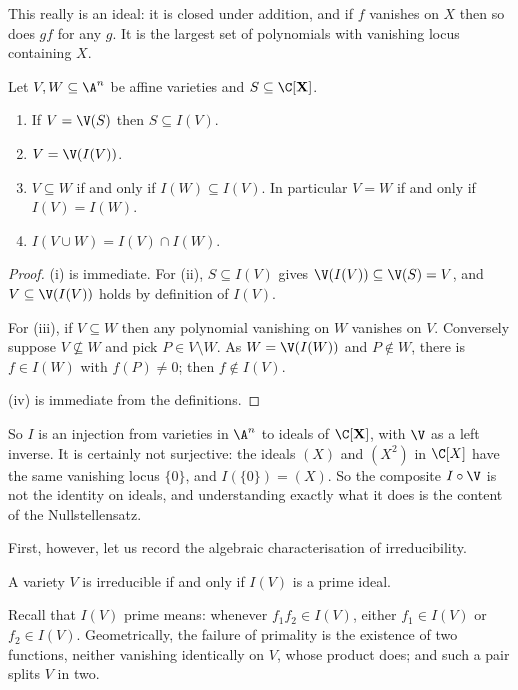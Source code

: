 This really is an ideal: it is closed under addition, and if $f$ vanishes on $X$ then so does $gf$ for any $g$. It is the largest set of polynomials with vanishing locus containing $X$.

\begin{proposition}\label{prop:IVbasic}
	Let $V, W \subseteq \A^n$ be affine varieties and $S \subseteq \C[\mathbf{X}]$.
	\begin{enumerate}[label=(\roman*)]
		\item If $V = \V(S)$ then $S \subseteq I(V)$.
		\item $V = \V(I(V))$.
		\item $V \subseteq W$ if and only if $I(W) \subseteq I(V)$. In particular $V = W$ if and only if $I(V) = I(W)$.
		\item $I(V \cup W) = I(V) \cap I(W)$.
	\end{enumerate}
\end{proposition}

\begin{proof}
	(i) is immediate. For (ii), $S \subseteq I(V)$ gives $\V(I(V)) \subseteq \V(S) = V$, and $V \subseteq \V(I(V))$ holds by definition of $I(V)$.

	For (iii), if $V \subseteq W$ then any polynomial vanishing on $W$ vanishes on $V$. Conversely suppose $V \not\subseteq W$ and pick $P \in V \setminus W$. As $W = \V(I(W))$ and $P \notin W$, there is $f \in I(W)$ with $f(P) \neq 0$; then $f \notin I(V)$.

	(iv) is immediate from the definitions.
\end{proof}

So $I$ is an injection from varieties in $\A^n$ to ideals of $\C[\mathbf{X}]$, with $\V$ as a left inverse. It is certainly not surjective: the ideals $(X)$ and $(X^2)$ in $\C[X]$ have the same vanishing locus $\{0\}$, and $I(\{0\}) = (X)$. So the composite $I \circ \V$ is not the identity on ideals, and understanding exactly what it does is the content of the Nullstellensatz.

First, however, let us record the algebraic characterisation of irreducibility.

\begin{proposition}\label{prop:irrprime}
	A variety $V$ is irreducible if and only if $I(V)$ is a prime ideal.
\end{proposition}

Recall that $I(V)$ prime means: whenever $f_1 f_2 \in I(V)$, either $f_1 \in I(V)$ or $f_2 \in I(V)$. Geometrically, the failure of primality is the existence of two functions, neither vanishing identically on $V$, whose product does; and such a pair splits $V$ in two.

